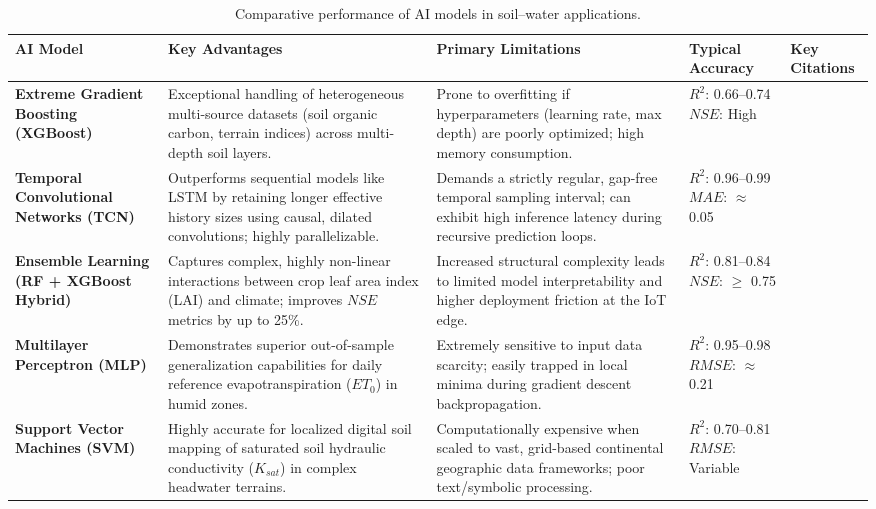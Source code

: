 \documentclass[land,article,submit,pdftex,moreauthors]{Definitions/mdpi}
\numberwithin{equation}{section}
\begin{document}
\begin{longtable}{@{\extracolsep{\fill}} p{} p{} p{} p{} p{} @{}}
\caption{Comparative performance of AI models in soil--water applications. \label{tab:performance}}\\
\toprule
\textbf{AI Model} & \textbf{Key Advantages} & \textbf{Primary Limitations} & \textbf{Typical Accuracy} & \textbf{Key Citations} \\
\midrule
\endhead 

\bottomrule
\endfoot 

\textbf{Extreme Gradient Boosting (XGBoost)} & 
Exceptional handling of heterogeneous multi-source datasets (soil organic carbon, terrain indices) across multi-depth soil layers. & 
Prone to overfitting if hyperparameters (learning rate, max depth) are poorly optimized; high memory consumption. & 
$R^2$: 0.66--0.74\newline $NSE$: High & 
\citep{Demir2026} \\ \hline

\textbf{Temporal Convolutional Networks (TCN)} & 
Outperforms sequential models like LSTM by retaining longer effective history sizes using causal, dilated convolutions; highly parallelizable. & 
Demands a strictly regular, gap-free temporal sampling interval; can exhibit high inference latency during recursive prediction loops. & 
$R^2$: 0.96--0.99\newline $MAE$: $\approx$ 0.05 & 
\citep{ScientificReports2025} \\ \hline

\textbf{Ensemble Learning (RF + XGBoost Hybrid)} & 
Captures complex, highly non-linear interactions between crop leaf area index (LAI) and climate; improves $NSE$ metrics by up to 25\%. & 
Increased structural complexity leads to limited model interpretability and higher deployment friction at the IoT edge. & 
$R^2$: 0.81--0.84\newline $NSE$: $\ge$ 0.75 & 
\citep{ResearchGate2026} \\ \hline

\textbf{Multilayer Perceptron (MLP)} & 
Demonstrates superior out-of-sample generalization capabilities for daily reference evapotranspiration ($ET_0$) in humid zones. & 
Extremely sensitive to input data scarcity; easily trapped in local minima during gradient descent backpropagation. & 
$R^2$: 0.95--0.98\newline $RMSE$: $\approx$ 0.21 & 
\citep{Acharki2025, Veredas2026} \\ \hline

\textbf{Support Vector Machines (SVM)} & 
Highly accurate for localized digital soil mapping of saturated soil hydraulic conductivity ($K_{sat}$) in complex headwater terrains. & 
Computationally expensive when scaled to vast, grid-based continental geographic data frameworks; poor text/symbolic processing. & 
$R^2$: 0.70--0.81\newline $RMSE$: Variable & 
\citep{MDPIReview2025, Authorea2026} \\

\end{longtable}
\normalsize
\end{document}
